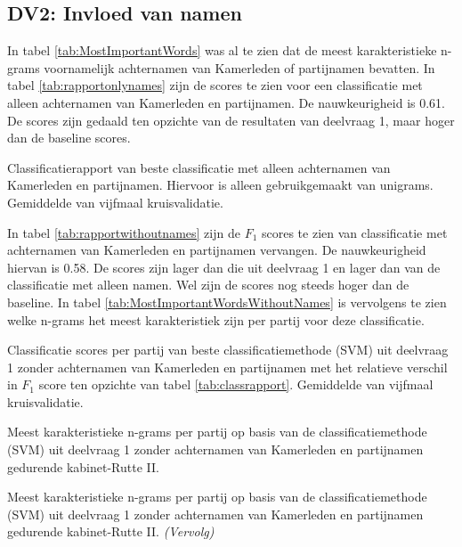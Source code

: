 \subsection{DV2: Invloed van namen}
In tabel \ref{tab:MostImportantWords} was al te zien dat de meest karakteristieke n-grams voornamelijk achternamen van Kamerleden of partijnamen bevatten. In tabel \ref{tab:rapportonlynames} zijn de scores te zien voor een classificatie met alleen achternamen van Kamerleden en partijnamen. De nauwkeurigheid is 0.61. De scores zijn gedaald ten opzichte van de resultaten van deelvraag 1, maar hoger dan de baseline scores.\par
\begin{table}[H]
\caption{Classificatierapport van beste classificatie met alleen achternamen van Kamerleden en partijnamen. Hiervoor is alleen gebruikgemaakt van unigrams. Gemiddelde van vijfmaal kruisvalidatie.}
\label{tab:rapportonlynames}
\centering

\end{table}

In tabel \ref{tab:rapportwithoutnames} zijn de $F_1$ scores te zien van classificatie met achternamen van Kamerleden en partijnamen vervangen. De nauwkeurigheid hiervan is 0.58. De scores zijn lager dan die uit deelvraag 1 en lager dan van de classificatie met alleen namen. Wel zijn de scores nog steeds hoger dan de baseline. In tabel \ref{tab:MostImportantWordsWithoutNames} is vervolgens te zien welke n-grams het meest karakteristiek zijn per partij voor deze classificatie.\par
\begin{table}[H]
\caption{Classificatie scores per partij van beste classificatiemethode (SVM) uit deelvraag 1 zonder achternamen van Kamerleden en partijnamen met het relatieve verschil in $F_1$ score ten opzichte van tabel \ref{tab:classrapport}. Gemiddelde van vijfmaal kruisvalidatie.}
\label{tab:rapportwithoutnames}
\centering

\end{table}

\begin{table}[H] 
\caption{Meest karakteristieke n-grams per partij op basis van de classificatiemethode (SVM) uit deelvraag 1 zonder achternamen van Kamerleden en partijnamen gedurende kabinet-Rutte II.} 
\label{tab:MostImportantWordsWithoutNames} 
\centering
\hspace*{-0.8in}
 
\end{table} 
\addtocounter{table}{-1} 
\begin{table}[H] 
\caption{Meest karakteristieke n-grams per partij op basis van de classificatiemethode (SVM) uit deelvraag 1 zonder achternamen van Kamerleden en partijnamen gedurende kabinet-Rutte II. \emph{(Vervolg)}} 
\centering
\hspace*{-1.3in}
 
\end{table}



